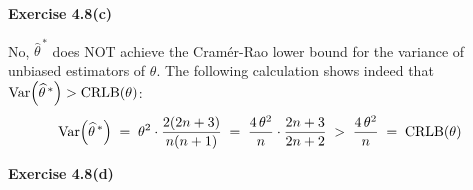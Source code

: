 \vskip 1.0cm
\noindent
\textbf{Exercise 4.8(c)}

No, $\widehat{\theta}^{\,*}$ does NOT achieve the Cram\'er-Rao lower bound for the variance of unbiased estimators of $\theta$.
The following calculation shows indeed that $\textnormal{Var}\!\left(\widehat{\theta}^{\,*}\right) > \textnormal{CRLB}(\theta)$:
\begin{equation*}
\textnormal{Var}\!\left(\widehat{\theta}^{\,*}\right)
\; = \; \theta^{2}\cdot\frac{2(2n+3)}{n(n+1)}
\; = \; \dfrac{4\,\theta^{2}}{n}\cdot\frac{2n+3}{2n+2}
\; > \; \dfrac{4\,\theta^{2}}{n}
\; = \; \textnormal{CRLB}(\theta)
\end{equation*}

\vskip 1.0cm
\noindent
\textbf{Exercise 4.8(d)}

